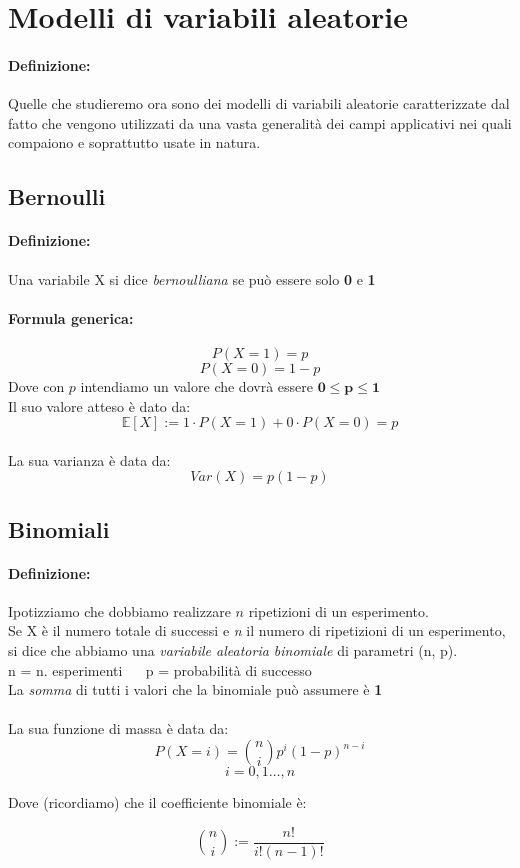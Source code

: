 \documentclass[]{article}
\newcommand{\ev}{\mathbb{E}[X]}
\renewcommand{\ev}[1]{\mathbb{E}[#1]}
\newcommand{\definizione}{\paragraph{Definizione:}}
\newcommand{\formula}{\paragraph{Formula generica:}}
\begin{document}
    \newpage
    \section{Modelli di variabili aleatorie}
    \definizione Quelle che studieremo ora sono dei modelli di variabili aleatorie caratterizzate 
    dal fatto che vengono utilizzati da una vasta generalità dei campi applicativi nei quali compaiono e soprattutto usate in natura.
    \subsection{Bernoulli}
    \definizione Una variabile X si dice \textit{bernoulliana} se può essere solo \textbf{0} e \textbf{1}
    \formula 
    \[ P(X = 1) = p \]
    \[ P(X = 0) = 1 - p \]
    Dove con $p$ intendiamo un valore che dovrà essere $\boldsymbol{0 \leq p \leq 1}$ \\
    Il suo valore atteso è dato da:
    \[ \ev{X} := 1 \cdot P(X = 1) + 0 \cdot P(X = 0) = p \] \\
    La sua varianza è data da:
    \[ Var(X) = p(1 - p) \]

    \newpage
    \subsection{Binomiali}
    \definizione Ipotizziamo che dobbiamo realizzare $n$ ripetizioni di un esperimento. \\
    Se X è il numero totale di successi e \textit{n} il numero di ripetizioni di un esperimento, \\
    si dice che abbiamo una
    \textit{variabile aleatoria binomiale} di parametri (n, p). \\ 
    n = n. esperimenti $\quad$ p = probabilità di successo \\
    La \textit{somma} di tutti i valori che la binomiale può assumere è \textbf{1} \\ \\
    La sua funzione di massa è data da:
    \[ P(X = i) = \binom{n}{i}p^i (1-p)^{n-i}  \]
    \[ i = 0,1 \ldots, n \]
    \centerline{Dove (ricordiamo) che il coefficiente binomiale è:}
    \[ \binom{n}{i} := \frac{n!}{i!(n-1)!} \]
\end{document}
